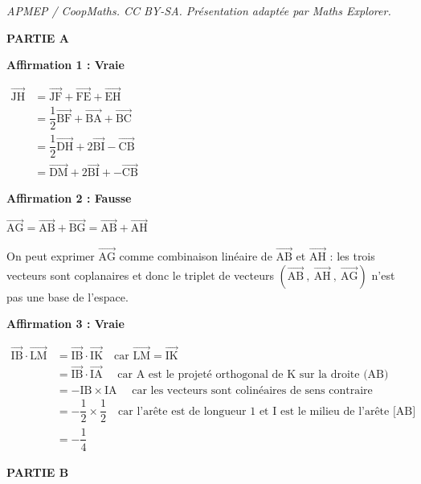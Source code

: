 \documentclass[10pt]{article}
\providecommand{\vect}[1]{\overrightarrow{#1}}
\begin{document}
\noindent\textit{APMEP / CoopMaths. CC BY-SA. Présentation adaptée par Maths Explorer.}\par\medskip
\medskip

\textbf{PARTIE A}

\medskip

\textbf{Affirmation 1 : Vraie }

\smallskip

$\begin{aligned}\vect{\text{JH}} & = \vect{\text{JF}} +\vect{\text{FE}} +\vect{\text{EH}}\\
  & = \dfrac{1}{2}\vect{\text{BF}}+ \vect{\text{BA}}+\vect{\text{BC}}\\
  &=   \dfrac{1}{2}\vect{\text{DH}}+ 2\vect{\text{BI}}-\vect{\text{CB}}\\
  &  =\vect{\text{DM}}  + 2\vect{\text{BI}} + - \vect{\text{CB}}
  	\end{aligned}$

\textbf{Affirmation 2 : Fausse }

\smallskip

$\vect{\text{AG}}=\vect{\text{AB}}+\vect{\text{BG}} = \vect{\text{AB}}+\vect{\text{AH}}$

On peut exprimer $\vect{\mathrm{AG}}$ comme combinaison linéaire de $\vect{\mathrm{AB}}$ et $\vect{\mathrm{AH}}$ : les trois vecteurs sont coplanaires et donc le triplet de vecteurs $\left(\vect{\text{AB}}~,~\vect{\text{AH}}~,~ \vect{\text{AG}}\right)$ n'est pas  une base de l'espace.

\textbf{Affirmation 3 : Vraie}

\smallskip

$\begin{aligned}
	\vect{\text{IB}} \cdot \vect{\text{LM}} &= \vect{\text{IB}} \cdot \vect{\text{IK}}\quad \text{car }\vect{\mathrm{LM}} = \vect{\mathrm{IK}}\\
	&= \vect{\text{IB}} \cdot \vect{\text{IA}}\quad \text{ car A est le projeté orthogonal de K sur la droite (AB)}\\
	&= -{\text{IB}} \times {\text{IA}} \quad\text{ car les vecteurs sont colinéaires de sens contraire}\\
	&= - \dfrac 12 \times \dfrac 12 \quad\text{car l'arête est de longueur 1 et I est le milieu de l'arête [AB]}\\
	&= -\dfrac 14
\end{aligned}$

\bigskip

\textbf{PARTIE B}
\end{document}
